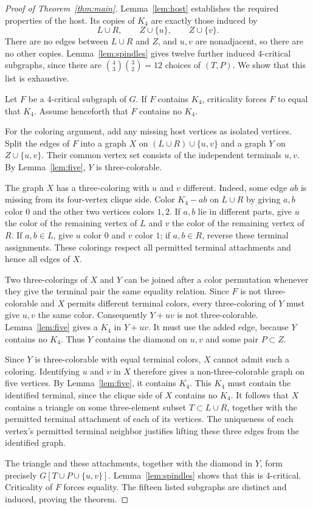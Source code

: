 \documentclass[11pt]{article}
\begin{document}
\begin{proof}[Proof of Theorem~\ref{thm:main}]
Lemma~\ref{lem:host} establishes the required properties of the
host. Its copies of $K_4$ are exactly those induced by
\[
 L\cup R,\qquad Z\cup\{u\},\qquad Z\cup\{v\}.
\]
There are no edges between $L\cup R$ and $Z$, and $u,v$ are
nonadjacent, so there are no other copies. Lemma~\ref{lem:spindles}
gives twelve further induced 4-critical subgraphs, since there
are $\binom43\binom32=12$ choices of $(T,P)$.
We show that this list is exhaustive.

Let $F$ be a 4-critical subgraph of $G$. If $F$ contains $K_4$,
criticality forces $F$ to equal that $K_4$. Assume henceforth
that $F$ contains no $K_4$.

For the coloring argument, add any missing host vertices as
isolated vertices. Split the edges of $F$ into a graph $X$ on
$(L\cup R)\cup\{u,v\}$ and a graph $Y$ on $Z\cup\{u,v\}$.
Their common vertex set consists of the independent terminals
$u,v$. By Lemma~\ref{lem:five}, $Y$ is three-colorable.

The graph $X$ has a three-coloring with $u$ and $v$ different.
Indeed, some edge $ab$ is missing from its four-vertex clique
side. Color $K_4-ab$ on $L\cup R$ by giving $a,b$ color $0$ and the
other two vertices colors $1,2$. If $a,b$ lie in different parts,
give $u$ the color of the remaining vertex of $L$ and $v$ the
color of the remaining vertex of $R$. If $a,b\in L$, give
$u$ color $0$ and $v$ color $1$; if $a,b\in R$, reverse these
terminal assignments. These colorings respect all permitted
terminal attachments and hence all edges of $X$.

Two three-colorings of $X$ and $Y$ can be joined after a color
permutation whenever they give the terminal pair the same
equality relation. Since $F$ is not three-colorable and $X$
permits different terminal colors, every three-coloring of $Y$
must give $u,v$ the same color. Consequently $Y+uv$ is not
three-colorable. Lemma~\ref{lem:five} gives a $K_4$ in $Y+uv$.
It must use the added edge, because $Y$ contains no $K_4$.
Thus $Y$ contains the diamond on $u,v$ and some pair
$P\subset Z$.

Since $Y$ is three-colorable with equal terminal colors, $X$
cannot admit such a coloring. Identifying $u$ and $v$ in $X$
therefore gives a non-three-colorable graph on five vertices.
By Lemma~\ref{lem:five}, it contains $K_4$. This $K_4$ must
contain the identified terminal, since the clique side of $X$
contains no $K_4$. It follows that $X$ contains a triangle on
some three-element subset $T\subset L\cup R$, together with
the permitted terminal attachment of each of its vertices.
The uniqueness of each vertex's permitted terminal neighbor
justifies lifting these three edges from the identified graph.

The triangle and these attachments, together with the diamond
in $Y$, form precisely $G[T\cup P\cup\{u,v\}]$.
Lemma~\ref{lem:spindles} shows that this is 4-critical.
Criticality of $F$ forces equality. The fifteen listed
subgraphs are distinct and induced, proving the theorem.
\end{proof}
\end{document}
